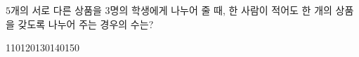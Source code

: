 \hspace*{2mm}\begin{minipage}[t]{\dimexpr\linewidth-2mm\relax}\vspace{0pt}
$5$개의 서로 다른 상품을 $3$명의 학생에게 나누어 줄 때, 한 사람이 적어도 한 개의 상품을 갖도록 나누어 주는 경우의 수는?
\begin{choices32}{110}{120}{130}{140}{150}\end{choices32}\end{minipage}

